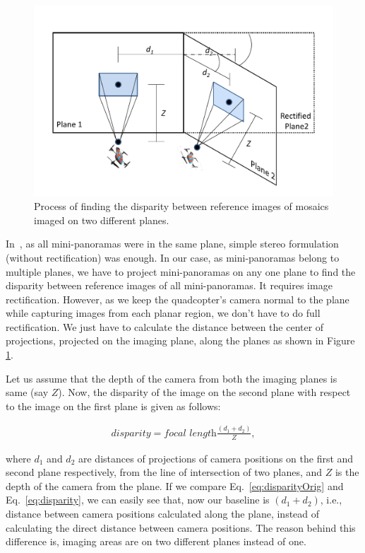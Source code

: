 \begin{figure}[ht!]
\centering
\includegraphics[width=\linewidth]{figures/multiplanar/MultiplanarMosaic}
\caption{Process of finding the disparity between reference images of mosaics
imaged on two different planes.}
\label{fig:multiplanarMosaic}
\end{figure}

In~\cite{Prasad16}, as all mini-panoramas were in the same plane, simple stereo
formulation (without rectification) was enough. In our case, as mini-panoramas belong to
multiple planes, we have to project mini-panoramas on any one plane to find the
disparity between reference images of all mini-panoramas. It requires image
rectification. However, as we keep the quadcopter's camera normal to the plane
while capturing images from each planar region, we don't have to do full
rectification. We just have to calculate the distance between the center of
projections, projected on the imaging plane, along the planes as shown in
Figure \ref{fig:multiplanarMosaic}.

Let us assume that the depth of the camera from both the imaging planes is same
(say $Z$). Now, the disparity of the image on the second plane with respect to
the image on the first plane is given as follows:
\begin{ceqn}
\begin{align}
\textit{disparity} = \textit{focal length}\frac{(d_1+d_2)}{Z},
\label{eq:disparity}
\end{align}
\end{ceqn}
where $d_1$ and $d_2$ are distances of projections of camera positions on the
first and second plane respectively, from the line of intersection of two
planes, and $Z$ is the depth of the camera from the plane.
If we compare Eq.~\ref{eq:disparityOrig} and Eq.~\ref{eq:disparity}, we can 
easily see that, now our baseline is $(d_1 + d_2)$, i.e., distance between
camera positions calculated along the plane, instead of calculating the direct 
distance between camera positions. The reason behind this difference is, imaging
areas are on two different planes instead of one.

